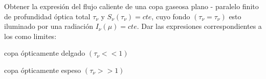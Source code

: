 \documentclass[12pt,spanish,a4paper]{practice}
\begin{document}
    \begin{problem}\label{prob:6}
        Obtener la expresión del flujo caliente de una copa gaseosa plano - paralelo finito de profundidad óptica total $\tau_{\nu}$ y $S_{\nu}(\tau_{\nu}) = cte$, cuyo fondo $(\tau_{\nu}=\tau_{\nu})$ esto iluminado por una radiación $I_{\nu}(\mu) = cte$. Dar las expresiones correspondientes a los como limites:

        \begin{ppart}\label{prob:6:a}
            copa ópticamente delgado $(\tau_{\nu}<< 1)$
        \end{ppart}

        \begin{ppart}\label{prob:6:b}
            copa ópticamente espeso $(\tau_{\nu}>>1)$
        \end{ppart}


    \end{problem}
\end{document}
